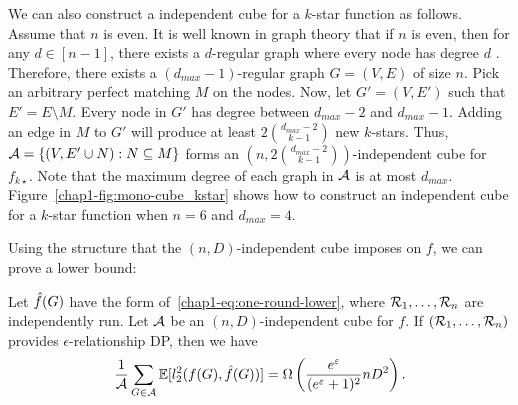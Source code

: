 We can also construct 
a independent cube for 
a $k$-star function 
as follows. 
Assume that $n$ is even. 
It is well known in graph theory that if $n$ is even, then 
for any $d\in[n-1]$, there exists a 
$d$-regular graph where every node has degree $d$ \cite{Ganesan_arXiv18}. 
Therefore, there exists a 
$(d_{max}-1)$-regular graph $G=(V,E)$ 
of size $n$. 
Pick an arbitrary perfect matching $M$ on the nodes. Now, let 
$G' = (V,E')$ such that $E' = E \setminus M$. 
Every node in $G'$ has degree between $d_{max}-2$ and $d_{max}-1$. 
Adding an edge in $M$ to $G'$ will produce at least
$2\binom{d_{max}-2}{k-1}$ new $k$-stars.
Thus, $\mathcal{A} = \{(V, E' \cup N): 
N \subseteq M\}$ forms an
$(n, 2\binom{d_{max}-2}{k-1})$-independent cube for $f_{k\star}$. 
Note that the maximum degree of each graph in $\mathcal{A}$ is at most $d_{max}$. 
Figure~\ref{chap1-fig:mono-cube_kstar} shows how to construct an independent cube for a $k$-star function when $n=6$ and $d_{max}=4$. 

Using the structure that the $(n,D)$-independent cube imposes on $f$,
we can prove a lower bound:
\begin{theorem}\label{chap1-thm:lower-bound}
  Let 
  $\hat{f}(G)$ 
  have the form of~\eqref{chap1-eq:one-round-lower}, 
  where $\mathcal{R}_1, \ldots, \mathcal{R}_n$ are independently run.
  Let $\cal{A}$ be an $(n,D)$-independent cube for $f$. 
  If 
  $(\mathcal{R}_1, \ldots, \mathcal{R}_n)$ 
  provides 
  $\epsilon$-relationship DP, 
  then 
  we have
  \[
    \frac{1}{\mathcal{A}} \sum_{G \in \mathcal{A}} \operatorname{\mathbb{E}}[l_2^2(f(G), \hat{f}(G))] =
    \Omega\left(\frac{e^{\varepsilon}}{(e^{\varepsilon}+1)^2}nD^2\right).
  \]
\end{theorem}

